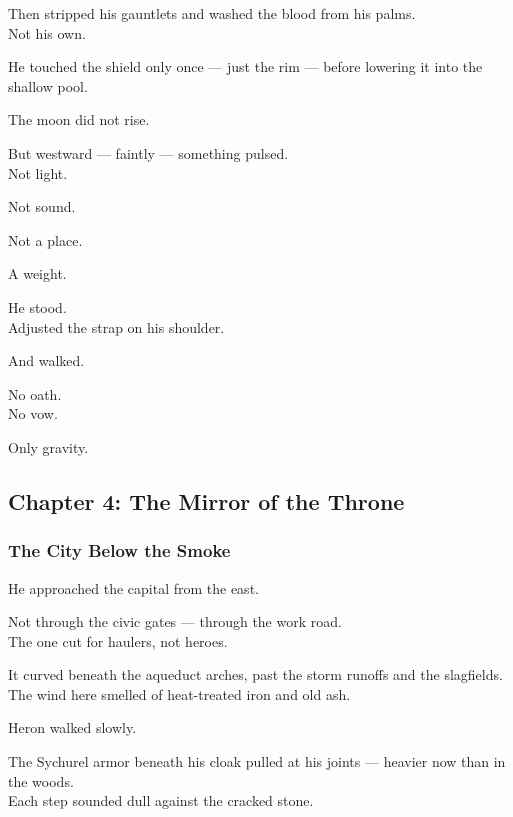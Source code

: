 \documentclass[12pt]{article}
\begin{document}
Then stripped his gauntlets and washed the blood from his palms.\\
Not his own.

He touched the shield only once — just the rim — before lowering it into the shallow pool.

\vspace{1em}

The moon did not rise.

But westward — faintly — something pulsed.\\
Not light.

Not sound.

Not a place.

A weight.

\vspace{1em}

He stood.\\
Adjusted the strap on his shoulder.

And walked.

\vspace{1em}

No oath.\\
No vow.

Only gravity.

\newpage

\subsection*{Chapter 4: The Mirror of the Throne}

\vspace{.5in}

\subsubsection*{The City Below the Smoke}

He approached the capital from the east.

Not through the civic gates — through the work road.\\
The one cut for haulers, not heroes.

It curved beneath the aqueduct arches, past the storm runoffs and the slagfields.\\
The wind here smelled of heat-treated iron and old ash.

\vspace{1em}

Heron walked slowly.

The Sychurel armor beneath his cloak pulled at his joints — heavier now than in the woods.\\
Each step sounded dull against the cracked stone.
\end{document}
